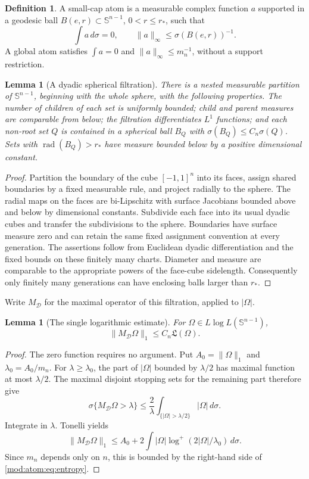 \documentclass[11pt]{article}
\numberwithin{equation}{section}
\newtheorem{lemma}[theorem]{Lemma}
\theoremstyle{remark}
\theoremstyle{definition}
\newtheorem{definition}[theorem]{Definition}
\newcommand{\Sph}{\mathbb S}
\newcommand{\norm}[1]{\lVert #1\rVert}
\newcommand{\LL}{\mathfrak L}
\begin{document}
\begin{definition}
A small-cap atom is a measurable complex function $a$ supported in a
geodesic ball $B(e,r)\subset\Sph^{n-1}$, $0<r\le r_*$, such that
\[
 \int a\,d\sigma=0,\qquad \norm a_\infty\le\sigma(B(e,r))^{-1}.
\]
A global atom satisfies $\int a=0$ and $\norm a_\infty\le m_n^{-1}$,
without a support restriction.
\end{definition}

\begin{lemma}[A dyadic spherical filtration]\label{mod:atom:lem:grid}
There is a nested measurable partition of $\Sph^{n-1}$, beginning with
the whole sphere, with the following properties. The number of children
of each set is uniformly bounded; child and parent measures are
comparable from below; the filtration differentiates $L^1$ functions;
and each non-root set $Q$ is contained in a spherical ball $B_Q$ with
$\sigma(B_Q)\le C_n\sigma(Q)$. Sets with $\operatorname{rad}(B_Q)>r_*$
have measure bounded below by a positive dimensional constant.
\end{lemma}
\begin{proof}
Partition the boundary of the cube $[-1,1]^n$ into its faces, assign
shared boundaries by a fixed measurable rule, and project radially to the
sphere. The radial maps on the faces are bi-Lipschitz with surface
Jacobians bounded above and below by dimensional constants. Subdivide
each face into its usual dyadic cubes and transfer the subdivisions to
the sphere. Boundaries have surface measure zero and can retain the
same fixed assignment convention at every generation. The assertions
follow from Euclidean dyadic differentiation and the fixed bounds on
these finitely many charts. Diameter and measure are comparable to the
appropriate powers of the face-cube sidelength. Consequently only
finitely many generations can have enclosing balls larger than $r_*$.
\end{proof}

Write $M_{\mathcal D}$ for the maximal operator of this filtration, applied
to $|\Omega|$.
\begin{lemma}[The single logarithmic estimate]\label{mod:atom:lem:entropy}
For $\Omega\in L\log L(\Sph^{n-1})$,
\begin{equation}\label{mod:atom:eq:entropy}
 \norm{M_{\mathcal D}\Omega}_1\le C_n\LL(\Omega).
\end{equation}
\end{lemma}
\begin{proof}
The zero function requires no argument. Put $A_0=\norm\Omega_1$ and
$\lambda_0=A_0/m_n$. For $\lambda\ge\lambda_0$, the part of $|\Omega|$
bounded by $\lambda/2$ has maximal function at most $\lambda/2$.
The maximal disjoint stopping sets for the remaining part therefore give
\[
 \sigma\{M_{\mathcal D}\Omega>\lambda\}
 \le\frac2\lambda\int_{\{|\Omega|>\lambda/2\}}|\Omega|\,d\sigma.
\]
Integrate in $\lambda$. Tonelli yields
\[
 \norm{M_{\mathcal D}\Omega}_1
 \le A_0+2\int|\Omega|\log^+(2|\Omega|/\lambda_0)\,d\sigma.
\]
Since $m_n$ depends only on $n$, this is bounded by the right-hand side
of \eqref{mod:atom:eq:entropy}.
\end{proof}
\end{document}
